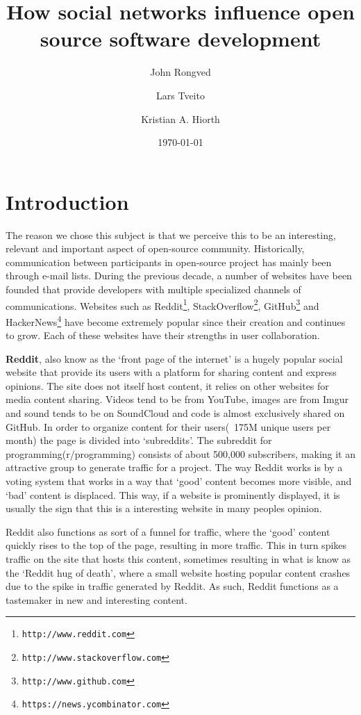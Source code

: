 \documentclass[a4paper,11pt]{article} %
\title{How social networks influence open source software development}
\date{\today}
\author{John Rongved \and Lars Tveito \and Kristian A. Hiorth}
\begin{document}
\ififorside{}

\tableofcontents{}

\section{Introduction}

The reason we chose this subject is that we perceive this to be an
interesting, relevant and important aspect of open-source
community. Historically, communication between participants in open-source
project has mainly been through e-mail lists. During the previous decade, a
number of websites have been founded that provide developers with multiple
specialized channels of communications. Websites such as
Reddit\footnote{\texttt{http://www.reddit.com}},
StackOverflow\footnote{\texttt{http://www.stackoverflow.com}},
GitHub\footnote{\texttt{http://www.github.com}} and
HackerNews\footnote{\texttt{https://news.ycombinator.com}} have become
extremely popular since their creation and continues to grow. Each of these
websites have their strengths in user collaboration.


\textbf{Reddit}, also know as the ‘front page of the internet’ is a hugely
popular social website that provide its users with a platform for sharing
content and express opinions. The site does not itself host content, it
relies on other websites for media content sharing. Videos tend to be from
YouTube, images are from Imgur and sound tends to be on SoundCloud and code
is almost exclusively shared on GitHub. In order to organize content for
their users(~175M unique users per month) the page is divided into
‘subreddits’. The subreddit for programming(r/programming) consists of about
500,000 subscribers, making it an attractive group to generate traffic for a
project. The way Reddit works is by a voting system that works in a way that
‘good’ content becomes more visible, and ‘bad’ content is displaced. This
way, if a website is prominently displayed, it is usually the sign that this
is a interesting website in many peoples opinion.


Reddit also functions as sort of a funnel for traffic, where the ‘good’
content quickly rises to the top of the page, resulting in more
traffic. This in turn spikes traffic on the site that hosts this content,
sometimes resulting in what is know as the ‘Reddit hug of death’, where a
small website hosting popular content crashes due to the spike in traffic
generated by Reddit. As such, Reddit functions as a tastemaker in new and
interesting content.
\end{document}

